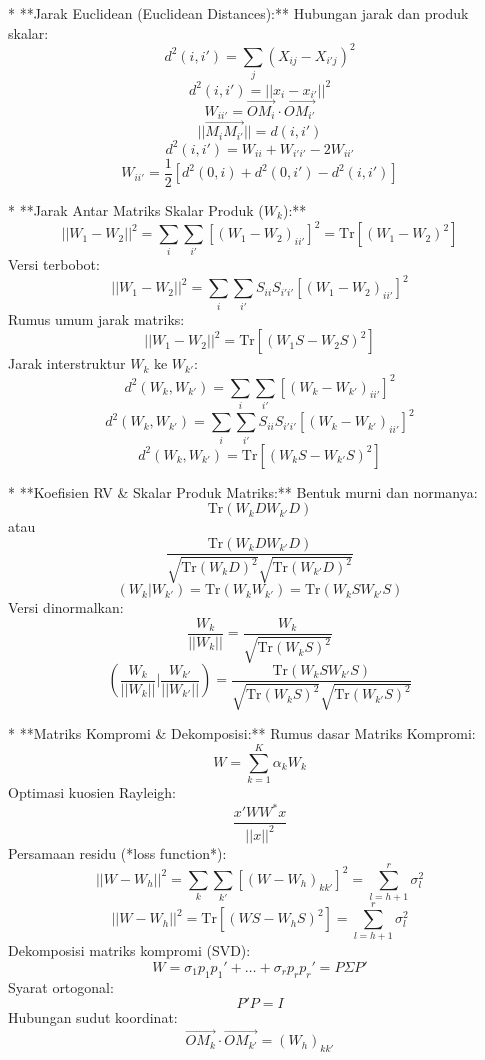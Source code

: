 *   **Jarak Euclidean (Euclidean Distances):**
    Hubungan jarak dan produk skalar:
    $$d^2(i, i') = \sum_j (X_{ij} - X_{i'j})^2$$
    $$d^2(i, i') = ||x_i - x_{i'}||^2$$
    $$W_{ii'} = \overrightarrow{OM_i} \cdot \overrightarrow{OM_{i'}}$$
    $$||\overrightarrow{M_i M_{i'}}|| = d(i, i')$$
    $$d^2(i, i') = W_{ii} + W_{i'i'} - 2W_{ii'}$$
    $$W_{ii'} = \frac{1}{2} [d^2(0, i) + d^2(0, i') - d^2(i, i')]$$

*   **Jarak Antar Matriks Skalar Produk ($W_k$):**
    $$||W_1 - W_2||^2 = \sum_i \sum_{i'} [(W_1 - W_2)_{ii'}]^2 = \text{Tr}[(W_1 - W_2)^2]$$
    Versi terbobot:
    $$||W_1 - W_2||^2 = \sum_i \sum_{i'} S_{ii} S_{i'i'} [(W_1 - W_2)_{ii'}]^2$$
    Rumus umum jarak matriks:
    $$||W_1 - W_2||^2 = \text{Tr}[(W_1 S - W_2 S)^2]$$
    Jarak interstruktur $W_k$ ke $W_{k'}$:
    $$d^2(W_k, W_{k'}) = \sum_i \sum_{i'} [(W_k - W_{k'})_{ii'}]^2$$
    $$d^2(W_k, W_{k'}) = \sum_i \sum_{i'} S_{ii} S_{i'i'} [(W_k - W_{k'})_{ii'}]^2$$
    $$d^2(W_k, W_{k'}) = \text{Tr}[(W_k S - W_{k'} S)^2]$$

*   **Koefisien RV & Skalar Produk Matriks:**
    Bentuk murni dan normanya:
    $$\text{Tr}(W_k D W_{k'} D)$$ atau $$\frac{\text{Tr}(W_k D W_{k'} D)}{\sqrt{\text{Tr}(W_k D)^2} \sqrt{\text{Tr}(W_{k'} D)^2}}$$
    $$(W_k|W_{k'}) = \text{Tr}(W_k W_{k'}) = \text{Tr}(W_k S W_{k'} S)$$
    Versi dinormalkan:
    $$\frac{W_k}{||W_k||} = \frac{W_k}{\sqrt{\text{Tr}(W_k S)^2}}$$
    $$\left( \frac{W_k}{||W_k||} \Big| \frac{W_{k'}}{||W_{k'}||} \right) = \frac{\text{Tr}(W_k S W_{k'} S)}{\sqrt{\text{Tr}(W_k S)^2} \sqrt{\text{Tr}(W_{k'} S)^2}}$$

*   **Matriks Kompromi & Dekomposisi:**
    Rumus dasar Matriks Kompromi:
    $$W = \sum_{k=1}^K \alpha_k W_k$$
    Optimasi kuosien Rayleigh:
    $$\frac{x' W W^* x}{||x||^2}$$
    Persamaan residu (*loss function*):
    $$||W - W_h||^2 = \sum_k \sum_{k'} [(W - W_h)_{kk'}]^2 = \sum_{l=h+1}^r \sigma_l^2$$
    $$||W - W_h||^2 = \text{Tr}[(W S - W_h S)^2] = \sum_{l=h+1}^r \sigma_l^2$$
    Dekomposisi matriks kompromi (SVD):
    $$W = \sigma_1 p_1 p_1' + \dots + \sigma_r p_r p_r' = P \Sigma P'$$
    Syarat ortogonal:
    $$P'P = I$$
    Hubungan sudut koordinat:
    $$\overrightarrow{OM_k} \cdot \overrightarrow{OM_{k'}} = (W_h)_{kk'}$$


